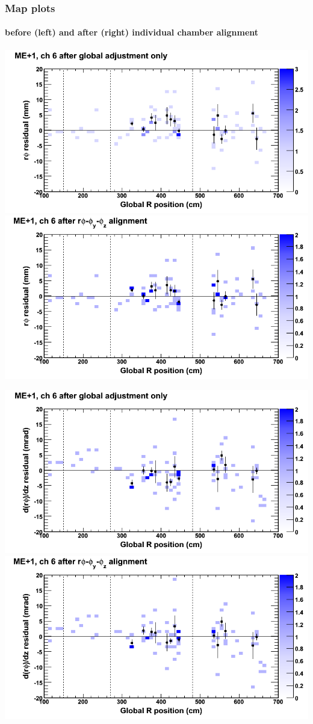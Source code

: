 \documentclass[compress]{beamer}
\begin{document}
\begin{frame}
\frametitle{Map plots}
\framesubtitle{before (left) and after (right) individual chamber alignment}
\includegraphics[width=0.5\linewidth]{ringmapplots_3dof/before_CSCvsr_mep1ch06_x.png} \includegraphics[width=0.5\linewidth]{ringmapplots_3dof/after_CSCvsr_mep1ch06_x.png}

\includegraphics[width=0.5\linewidth]{ringmapplots_3dof/before_CSCvsr_mep1ch06_dxdz.png} \includegraphics[width=0.5\linewidth]{ringmapplots_3dof/after_CSCvsr_mep1ch06_dxdz.png}
\end{frame}
\end{document}
